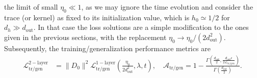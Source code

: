 \documentclass[a4paper,11pt]{article}
\newcommand{\dout}{d_\mathrm{out}}
\newcommand{\training}{\mathrm{tr}}
\begin{document}
the limit of small $\eta_0 \ll1$, as we may ignore the time evolution and consider the trace (or kernel) as fixed to its initialization value, which is $h_0\simeq 1/2$ for $d_h \gg d_\mathrm{out}$. In that case the loss solutions are a simple modification to the ones given in the previous sections, with the replacement $\eta_0 \to \eta_0 /(2 d_\mathrm{out}^2)$.
Subsequently, the training/generalization performance metrics are 
\begin{align}
  \mathcal{L}_\mathrm{\training/gen}^\mathrm{2-layer} 
  &= 
  \|D_0 \|^2
  \mathcal{L}_\mathrm{\training/gen}^\mathrm{1-layer}
  \left(
  \frac{\eta_0 }{2 \dout^2}, \lambda, t
  \right),
  \quad
    \mathcal{A}_\mathrm{\training/gen} = 
  1-\frac{\Gamma \left(\frac{\dout}{2},\frac{\dout \epsilon }{2 \mathcal{L}_\mathrm{\training/gen}}\right)}{\Gamma \left(\frac{\dout}{2}\right)} .
\end{align}
\end{document}

